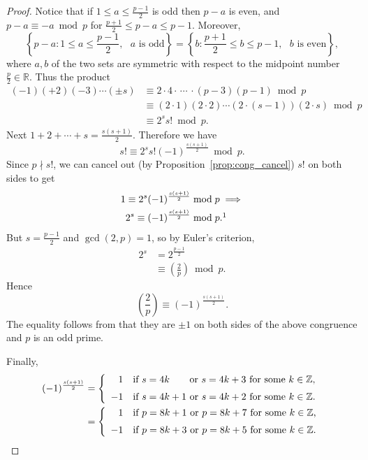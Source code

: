 \documentclass{amsbook}
\theoremstyle{plain}
\theoremstyle{definition}
\theoremstyle{remark}
\numberwithin{equation}{chapter}
\numberwithin{figure}{chapter}
\newcommand{\Z}{\mathbb{Z}}
\newcommand{\R}{\mathbb{R}}
\begin{document}
\begin{proof}
  Notice that if $1 \leqslant a \leqslant \frac{p-1}2$ is odd then $p - a$ is even, and $p - a \equiv -a \bmod p$ for $\frac{p+1}2 \leqslant p - a \leqslant p - 1$. Moreover,
  \[
    \left\{p-a : 1 \leqslant a \leqslant \frac{p-1}2, \text{ $a$ is odd} \right\} = \left\{ b : \frac{p+1}2 \leqslant b \leqslant p-1, \text{ $b$ is even} \right\},
  \]
  where $a, b$ of the two sets are symmetric with respect to the midpoint number $\frac{p}2 \in \R$.
  Thus the product
  \begin{align}
    (-1)(+2)(-3)\cdots(\pm s) &\equiv 2 \cdot 4 \cdot \, \cdots \, \cdot (p-3)(p-1) \bmod p \\
                              &\equiv (2\cdot 1)(2\cdot 2) \cdots (2\cdot (s-1)) (2\cdot s) \bmod p \\
                              &\equiv 2^s s! \bmod p.
  \end{align}
  Next $1+2+\cdots +s = \frac{s(s+1)}2$. Therefore we have
  \[
    s! \equiv 2^s s! (-1)^{\frac{s(s+1)}2} \bmod p.
  \]
  Since $p \nmid s!$, we can cancel out (by Proposition~\ref{prop:cong_cancel}) $s!$ on both sides to get
  \begin{align}
    1 \equiv 2^s (-1)^{\frac{s(s+1)}2} &\bmod p \implies \\
    2^s \equiv (-1)^{\frac{s(s+1)}2} &\bmod p. \footnotemark
  \end{align}
  But $s = \frac{p-1}2$ and $\gcd (2, p) = 1$, so by Euler's criterion,
  \begin{align}
    2^s &= 2^{\frac{p-1}2} \\
        &\equiv \left( \frac{2}p \right) \bmod p.
  \end{align}
  Hence
  \[
    \left( \frac{2}p \right) \equiv (-1)^{\frac{s(s+1)}2}.
  \]
  The equality follows from that they are $\pm 1$ on both sides of the above congruence and $p$ is an odd prime.

  Finally,
  \begin{align}
    (-1)^{\frac{s(s+1)}2} & = \left\{ \begin{array}{rl}
                                      1 & \text{if $s = 4k$ \hspace{6mm}or $s = 4k+3$ for some $k \in \Z$,} \\[2mm]
                                        -1 & \text{if $s = 4k+1$ or $s = 4k+2$ for some $k \in \Z$.}
                                      \end{array} \right. \\
    & = \left\{ \begin{array}{rl}
                                      1 & \text{if $p = 8k+1$ or $p = 8k+7$ for some $k \in \Z$,} \\[2mm]
                                        -1 & \text{if $p = 8k+3$ or $p = 8k+5$ for some $k \in \Z$.}
                \end{array} \right.
  \end{align}
\end{proof}
\end{document}
